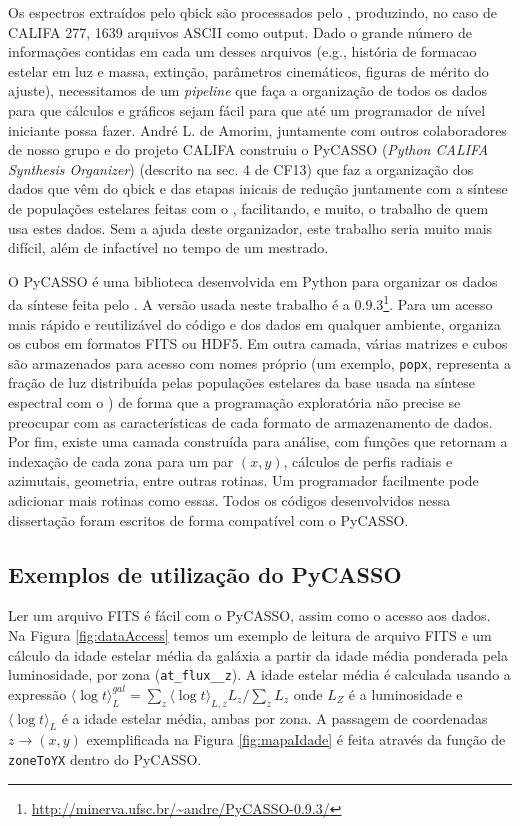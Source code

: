 Os espectros extraídos pelo {\sc qbick} são processados pelo \starlight, produzindo, no caso de CALIFA 277, 1639
arquivos ASCII como output. Dado o grande número de informações contidas em cada um desses arquivos (e.g., história de
formacao estelar em luz e massa, extinção, parâmetros cinemáticos, figuras de mérito do ajuste), necessitamos de um {\em
pipeline} que faça a organização de todos os dados para que cálculos e gráficos sejam fácil para que até um programador
de nível iniciante possa fazer. André L. de Amorim, juntamente com outros colaboradores de nosso grupo e do projeto
CALIFA construiu o PyCASSO ({\em Python CALIFA \starlight Synthesis Organizer}) (descrito na sec. 4 de CF13) que faz a
organização dos dados que vêm do {\sc qbick} e das etapas inicais de redução juntamente com a síntese de populações
estelares feitas com o \starlight, facilitando, e muito, o trabalho de quem usa estes dados. Sem a ajuda deste
organizador, este trabalho seria muito mais difícil, além de infactível no tempo de um mestrado.

O PyCASSO é uma biblioteca desenvolvida em Python para organizar os dados da síntese feita pelo \starlight. A versão
usada neste trabalho é a $0.9.3$\footnote{\url{http://minerva.ufsc.br/~andre/PyCASSO-0.9.3/}}. Para um acesso mais
rápido e reutilizável do código e dos dados em qualquer ambiente, organiza os cubos em formatos FITS ou HDF5. Em outra
camada, várias matrizes e cubos são armazenados para acesso com nomes próprio (um exemplo, \texttt{popx}, representa a
fração de luz distribuída pelas populações estelares da base usada na síntese espectral com o \starlight) de forma que a
programação exploratória não precise se preocupar com as características de cada formato de armazenamento de dados. Por
fim, existe uma camada construída para análise, com funções que retornam a indexação de cada zona para um par $(x, y)$,
cálculos de perfis radiais e azimutais, geometria, entre outras rotinas. Um programador facilmente pode adicionar mais
rotinas como essas. Todos os códigos desenvolvidos nessa dissertação foram escritos de forma compatível com o PyCASSO.

\subsection{Exemplos de utilização do PyCASSO}

Ler um arquivo FITS é fácil com o PyCASSO, assim como o acesso aos dados. Na Figura \ref{fig:dataAccess} temos um
exemplo de leitura de arquivo FITS e um cálculo da idade estelar média da galáxia a partir da idade média ponderada pela
luminosidade, por zona (\texttt{at\_flux\_\_z}). A idade estelar média é calculada usando a expressão $ \langle \log t
\rangle^{gal}_L = \sum_z \langle \log t \rangle_{L,z} L_z /\sum_z L_z$ onde $L_Z $ é a luminosidade e $ \langle \log t
\rangle_L $ é a idade estelar média, ambas por zona.  A passagem de coordenadas $z \to (x, y)$ exemplificada na Figura
\ref{fig:mapaIdade} é feita através da função de \texttt{zoneToYX} dentro do PyCASSO.

